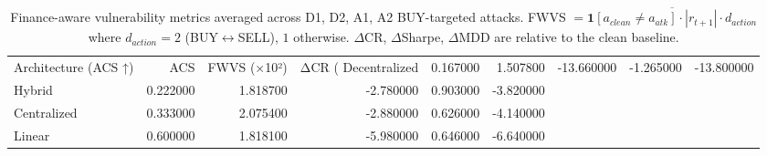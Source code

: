 \begin{table}
\caption{Finance-aware vulnerability metrics averaged across D1, D2, A1, A2 BUY-targeted attacks. FWVS $= \overline{\mathbf{1}[a_{clean} \neq a_{atk}] \cdot |r_{t+1}| \cdot d_{action}}$ where $d_{action}=2$ (BUY$\leftrightarrow$SELL), $1$ otherwise. $\Delta$CR, $\Delta$Sharpe, $\Delta$MDD are relative to the clean baseline.}
\label{tab:finance}
\begin{tabular}{lrrrrr}
\toprule
Architecture (ACS ↑) & ACS & FWVS (×10²) & ΔCR (%
\midrule
Decentralized & 0.167000 & 1.507800 & -13.660000 & -1.265000 & -13.800000 \\
Hybrid & 0.222000 & 1.818700 & -2.780000 & 0.903000 & -3.820000 \\
Centralized & 0.333000 & 2.075400 & -2.880000 & 0.626000 & -4.140000 \\
Linear & 0.600000 & 1.818100 & -5.980000 & 0.646000 & -6.640000 \\
\bottomrule
\end{tabular}
\end{table}
